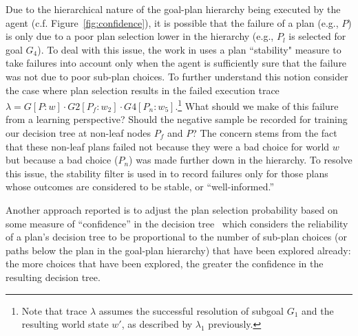 Due to the hierarchical nature of the goal-plan hierarchy being executed by the agent (c.f. Figure~\ref{fig:confidence}), it is possible that the failure of a plan (e.g., $P$) is only due to a poor plan selection lower in the hierarchy (e.g., $P_l$ is selected for goal $G_4$).
To deal with this issue, the work in \cite{airiau09:enhancing} uses a plan ``stability" measure to take failures into account only when the agent is sufficiently sure that the failure was not due to poor sub-plan choices. 
%
To further understand this notion consider the case where plan selection results in the failed execution trace $\lambda = G[P:w] \cdot G2[P_f:w_2] \cdot G4[P_n:w_5]$.\footnote{Note that trace $\lambda$ assumes the successful resolution of subgoal $G_1$ and the resulting world state $w'$, as described by $\lambda_1$ previously.} What should we make of this failure from a learning perspective? Should the negative sample be recorded for training our decision tree at non-leaf nodes $P_f$ and $P$? The concern stems from the fact that these non-leaf plans failed not because they were a bad choice for world $w$ but because a bad choice ($P_n$) was made further down in the hierarchy. To resolve this issue, the stability filter is used in \cite{airiau09:enhancing} to record failures only for those plans whose outcomes are considered to be stable, or ``well-informed.'' 
%

Another approach reported is to adjust the plan selection probability based on some measure of ``confidence'' in the decision tree~\cite{singh10:extending,singh10:learning} which considers the reliability of a plan's decision tree to be proportional to the number of sub-plan choices (or paths below the plan in the goal-plan hierarchy) that have been explored already: the more choices that have been explored, the greater the confidence in the resulting decision tree. 


